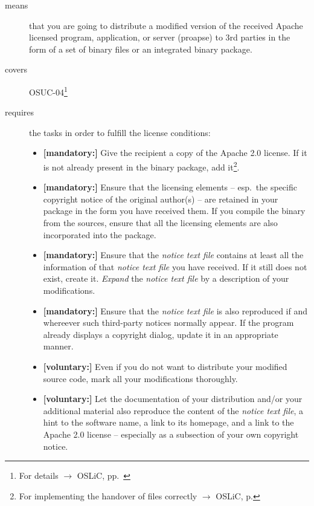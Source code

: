 \begin{description}
\item[means] that you are going to distribute a modified version of the received
Apache licensed pro\-gram, application, or server (proapse) to 3rd parties in
the form of a set of binary files or an integrated binary package.
\item[covers] OSUC-04\footnote{For details $\rightarrow$ OSLiC, pp.\ \pageref{OSUC-04-DEF}}
\item[requires] the tasks in order to fulfill the license conditions:
\begin{itemize}

 \item \textbf{[mandatory:]} Give the recipient a copy of the Apache 2.0
  license. If it is not already present in the binary package, add
  it\footnote{For implementing the handover of files correctly $\rightarrow$
  OSLiC, p. \pageref{DistributingFilesHint}}.
  
  \item \textbf{[mandatory:]} Ensure that the licensing elements -- esp.\ the
  specific copyright notice of the original author(s) -- are retained in your
  package in the form you have received them. If you compile the binary from the
  sources, ensure that all the licensing elements are also incorporated into the
  package.
  
  \item \textbf{[mandatory:]} Ensure that the \emph{notice text file} contains
  at least all the information of that \emph{notice text file} you have
  received. If it still does not exist, create it. \emph{Expand} the
  \emph{notice text file} by a description of your modifications.
  
  \item \textbf{[mandatory:]} Ensure that the \emph{notice text file} is also
  reproduced if and whereever such third-party notices normally appear. If the
  program already displays a copyright dialog, update it in an appropriate
  manner.
 
  \item \textbf{[voluntary:]} Even if you do not want to distribute your
  modified source code, mark all your modifications thoroughly.
 
  \item \textbf{[voluntary:]} Let the documentation of your distribution and/or
  your additional material also reproduce the content of the \emph{notice text
  file}, a hint to the software name, a link to its homepage, and a link to the
  Apache 2.0 license -- especially as a subsection of your own copyright notice.


\end{itemize}
\end{description}
